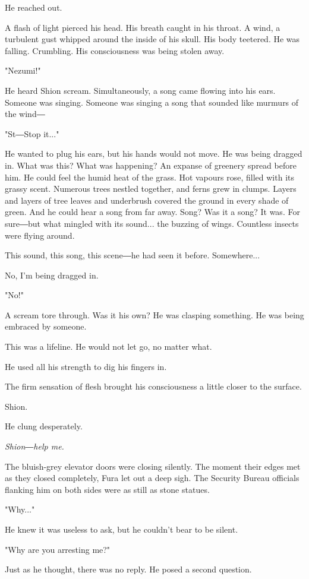 He reached out.

A flash of light pierced his head. His breath caught in his throat. A
wind, a turbulent gust whipped around the inside of his skull. His body
teetered. He was falling. Crumbling. His consciousness was being stolen
away.

"Nezumi!"

He heard Shion scream. Simultaneously, a song came flowing into his
ears. Someone was singing. Someone was singing a song that sounded like
murmurs of the wind―

"St―Stop it..."

He wanted to plug his ears, but his hands would not move. He was being
dragged in. What was this? What was happening? An expanse of greenery
spread before him. He could feel the humid heat of the grass. Hot
vapours rose, filled with its grassy scent. Numerous trees nestled
together, and ferns grew in clumps. Layers and layers of tree leaves and
underbrush covered the ground in every shade of green. And he could hear
a song from far away. Song? Was it a song? It was. For sure―but what
mingled with its sound... the buzzing of wings. Countless insects were
flying around.

This sound, this song, this scene―he had seen it before. Somewhere...

No, I'm being dragged in.

"No!"

A scream tore through. Was it his own? He was clasping something. He was
being embraced by someone.

This was a lifeline. He would not let go, no matter what.

He used all his strength to dig his fingers in.

The firm sensation of flesh brought his consciousness a little closer to
the surface.

Shion.~

He clung desperately.

\emph{Shion―help me.}

The bluish-grey elevator doors were closing silently. The moment their
edges met as they closed completely, Fura let out a deep sigh. The
Security Bureau officials flanking him on both sides were as still as
stone statues.

"Why..."

He knew it was useless to ask, but he couldn't bear to be silent.

"Why are you arresting me?"

Just as he thought, there was no reply. He posed a second question.

